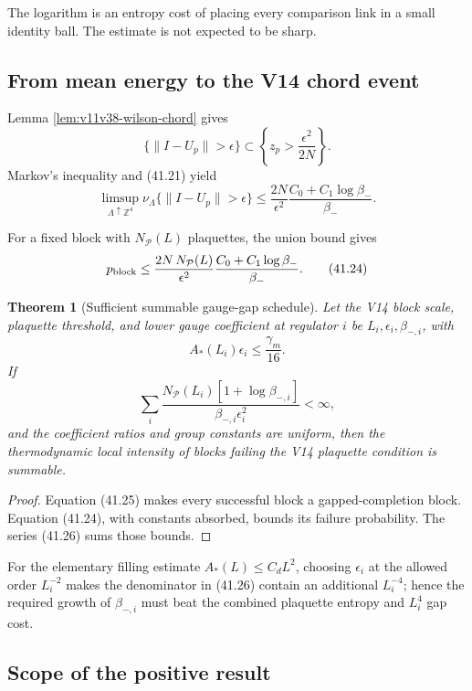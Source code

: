 \documentclass[11pt]{article}
\newtheorem{theorem}{Theorem}[section]
\begin{document}
The logarithm is an entropy cost of placing every comparison link in a
small identity ball.  The estimate is not expected to be sharp.

\subsection{From mean energy to the V14 chord event}

Lemma \ref{lem:v11v38-wilson-chord} gives
\[
 \{\|I-U_p\|>\epsilon\}
 \subset
 \left\{z_p>\frac{\epsilon^2}{2N}\right\}.
 \tag{41.22}
\]
Markov's inequality and (41.21) yield
\[
 \limsup_{\Lambda\uparrow\mathbb Z^4}
 \nu_\Lambda\{\|I-U_p\|>\epsilon\}
 \leq
 \frac{2N}{\epsilon^2}
 \frac{C_0+C_1\log\beta_-}{\beta_-}.
 \tag{41.23}
\]

For a fixed block with \(N_{\mathcal P}(L)\) plaquettes, the union bound
gives
\[
 p_{\rm block}
 \leq
 \frac{2N\,N_{\mathcal P}(L)}{\epsilon^2}
 \frac{C_0+C_1\log\beta_-}{\beta_-}.
 \tag{41.24}
\]

\begin{theorem}[Sufficient summable gauge-gap schedule]
\label{thm:v11v41-schedule}
Let the V14 block scale, plaquette threshold, and lower gauge coefficient
at regulator \(i\) be \(L_i,\epsilon_i,\beta_{-,i}\), with
\[
 A_*(L_i)\epsilon_i\leq\frac{\gamma_m}{16}.
 \tag{41.25}
\]
If
\[
 \sum_i
 \frac{
 N_{\mathcal P}(L_i)
 [1+\log\beta_{-,i}]
 }{
 \beta_{-,i}\epsilon_i^2
 }
 <\infty,
 \tag{41.26}
\]
and the coefficient ratios and group constants are uniform, then the
thermodynamic local intensity of blocks failing the V14 plaquette
condition is summable.
\end{theorem}

\begin{proof}
Equation (41.25) makes every successful block a gapped-completion block.
Equation (41.24), with constants absorbed, bounds its failure
probability.  The series (41.26) sums those bounds.
\end{proof}

For the elementary filling estimate \(A_*(L)\leq C_dL^2\), choosing
\(\epsilon_i\) at the allowed order \(L_i^{-2}\) makes the denominator
in (41.26) contain an additional \(L_i^{-4}\); hence the required
growth of \(\beta_{-,i}\) must beat the combined plaquette entropy and
\(L_i^4\) gap cost.

\subsection{Scope of the positive result}
\end{document}
